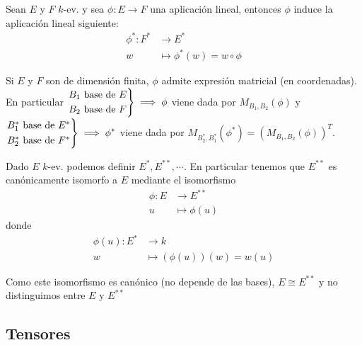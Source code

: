 \begin{prop}
	Sean $E$ y $F$ $k$-ev. y sea $\phi \colon E \to F$ una
	aplicación lineal, entonces $\phi$ induce la aplicación
	lineal siguiente:
	\[
		\begin{aligned}
		\phi^* \colon F^* &\to E^*\\
		w &\mapsto \phi^*(w) = w \circ \phi
		\end{aligned}
	\]
\end{prop}
\begin{obs}
	Si $E$ y $F$ son de dimensión finita, $\phi$ admite expresión
	matricial (en coordenadas). En particular
	$\displaystyle \begin{rcases} B_1 \text{ base de } E \\ B_2
	\text{ base de } F \end{rcases} \implies \phi$ viene dada por
	$M_{B_1,B_2}(\phi)$ y $\displaystyle \begin{rcases} B_1^*
	\text{ base de } E^* \\ B_2^* \text{ base de } F^*
	\end{rcases} \implies \phi^*$ viene dada por 
	$M_{B_2^*,B_1^*}(\phi^*) = (M_{B_1,B_2}(\phi))^T$.
\end{obs}
\begin{prop}
	Dado $E$ $k$-ev. podemos definir $E^*,E^{**},\cdots$. En
	particular tenemos que $E^{**}$ es canónicamente isomorfo a
	$E$ mediante el isomorfismo
	\[
		\begin{aligned}
			\phi \colon E &\to E^{**}\\
			u &\mapsto \phi(u)
		\end{aligned}
	\]
	donde
	\[
		\begin{aligned}
			\phi(u) \colon E^* &\to k \\
			w &\mapsto (\phi(u))(w) = w(u)
		\end{aligned}
	\]
\end{prop}
\begin{obs}
	Como este isomorfismo es canónico (no depende de las bases),
	$E \cong E^{**}$ y no distinguimos entre $E$ y $E^{**}$
\end{obs}



\subsection{Tensores}

